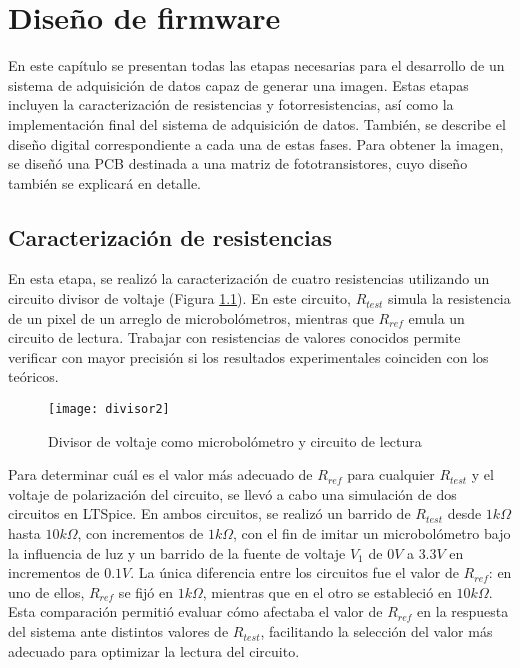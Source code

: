 \chapter{Diseño de firmware}
En este capítulo se presentan todas las etapas necesarias para el desarrollo de un sistema de adquisición de datos capaz de generar una imagen. Estas etapas incluyen la caracterización de resistencias y fotorresistencias, así como la implementación final del sistema de adquisición de datos. También, se describe el diseño digital correspondiente a cada una de estas fases. Para obtener la imagen, se diseñó una PCB destinada a una matriz de fototransistores, cuyo diseño también se explicará en detalle.

\section{Caracterización de resistencias}
En esta etapa, se realizó la caracterización de cuatro resistencias utilizando un circuito divisor de voltaje (Figura \ref{fig:divisor2}). En este circuito, $R_{test}$ simula la resistencia de un pixel de un arreglo de microbolómetros, mientras que $R_{ref}$ emula un circuito de lectura. Trabajar con resistencias de valores conocidos permite verificar con mayor precisión si los resultados experimentales coinciden con los teóricos. 


            \begin{figure}[hbtp]
                \centering
                \texttt{[image: divisor2]}
                \caption{Divisor de voltaje como microbolómetro y circuito de lectura}
                \label{fig:divisor2}
            \end{figure} 


Para determinar cuál es el valor más adecuado de $R_{ref}$ para cualquier $R_{test}$ y el voltaje de polarización del circuito, se llevó a cabo una simulación de dos circuitos en LTSpice. En ambos circuitos, se realizó un barrido de $R_{test}$ desde $1k\Omega$ hasta $10k\Omega$, con incrementos de $1k\Omega$, con el fin de imitar un microbolómetro bajo la influencia de luz y un barrido de la fuente de voltaje $V_{1}$ de $0V$ a $3.3V$ en incrementos de $0.1V$. La única diferencia entre los circuitos fue el valor de $R_{ref}$: en uno de ellos, $R_{ref}$ se fijó en $1k\Omega$, mientras que en el otro se estableció en $10k\Omega$. Esta comparación permitió evaluar cómo afectaba el valor de $R_{ref}$ en la respuesta del sistema ante distintos valores de $R_{test}$, facilitando la selección del valor más adecuado para optimizar la lectura del circuito.

